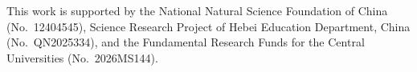 \documentclass[pdflatex,sn-mathphys-num]{sn-jnl}
\theoremstyle{thmstyleone}%
\theoremstyle{thmstyletwo}%
\theoremstyle{thmstylethree}%
\begin{document}
\backmatter


This work is supported by the National Natural Science Foundation of China (No.~12404545), Science Research Project of Hebei Education Department, China (No.~QN2025334), and the Fundamental Research Funds for the Central Universities (No.~2026MS144).




\end{document}
